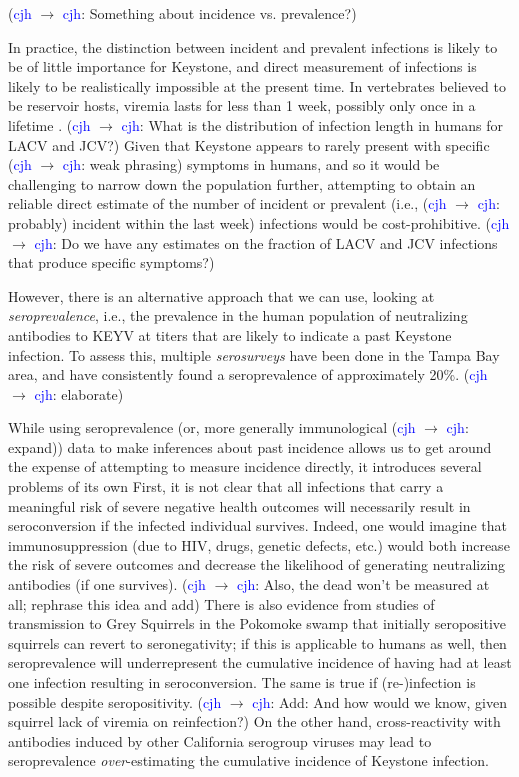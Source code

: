 \documentclass[12pt]{article}
\newcommand{\cjh}{\textcolor{blue}{cjh}}
\newcommand{\msg}[3]{(#1 $\rightarrow$ #2: #3)}
\newcommand{\mcc}[1]{\msg\cjh\cjh{#1}}
\begin{document}
        \mcc{Something about incidence vs. prevalence?}

        In practice, the distinction between incident and prevalent infections is likely to be of little importance for Keystone, and direct measurement of infections is likely to be realistically impossible at the present time. In vertebrates believed to be reservoir hosts, viremia lasts for less than 1 week, possibly only once in a lifetime \cite{asdf}. \mcc{What is the distribution of infection length in humans for LACV and JCV?} Given that Keystone appears to rarely present with specific \mcc{weak phrasing} symptoms in humans, and so it would be challenging to narrow down the population further, attempting to obtain an reliable direct estimate of the number of incident or prevalent (i.e., \mcc{probably} incident within the last week) infections would be cost-prohibitive. \mcc{Do we have any estimates on the fraction of LACV and JCV infections that produce specific symptoms?}
        

        However, there is an alternative approach that we can use, looking at \textit{seroprevalence}, i.e., the prevalence in the human population of neutralizing antibodies to KEYV at titers that are likely to indicate a past Keystone infection. To assess this, multiple \textit{serosurveys} have been done in the Tampa Bay area\cite{asdf}, and have consistently found a seroprevalence of approximately 20\%\cite{asdf}. \mcc{elaborate}

        While using seroprevalence (or, more generally immunological \mcc{expand}) data to make inferences about past incidence allows us to get around the expense of attempting to measure incidence directly, it introduces several problems of its own First, it is not clear that all infections that carry a meaningful risk of severe negative health outcomes will necessarily result in seroconversion if the infected individual survives. Indeed, one would imagine that immunosuppression (due to HIV, drugs, genetic defects, etc.) would both increase the risk of severe outcomes and decrease the likelihood of generating neutralizing antibodies (if one survives). \mcc{Also, the dead won't be measured at all; rephrase this idea and add} There is also evidence from studies of transmission to Grey Squirrels in the Pokomoke swamp\cite{asdf} that initially seropositive squirrels can revert to seronegativity; if this is applicable to humans as well, then seroprevalence will underrepresent the cumulative incidence of having had at least one infection resulting in seroconversion. The same is true if (re-)infection is possible despite seropositivity. \mcc{Add: And how would we know, given squirrel lack of viremia on reinfection?} On the other hand, cross-reactivity with antibodies induced by other California serogroup viruses may lead to seroprevalence \textit{over}-estimating the cumulative incidence of Keystone infection.
\end{document}
